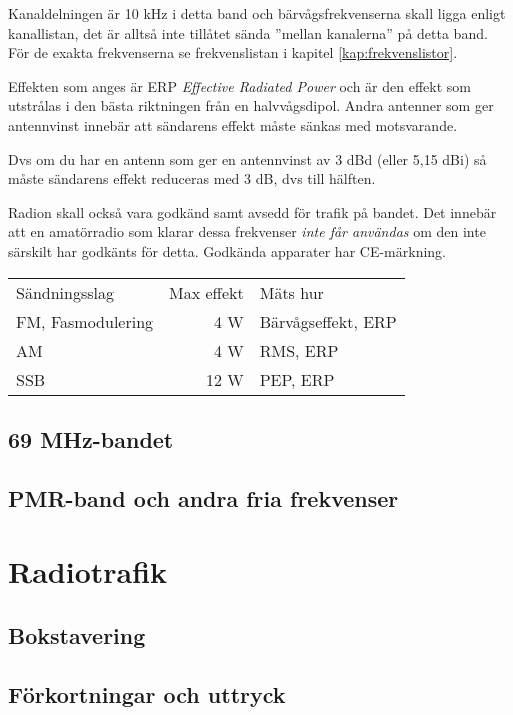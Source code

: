 \documentclass[12ypt,swedish,a4paper]{report}
\begin{document}
Kanaldelningen är 10 kHz i detta band och bärvågsfrekvenserna skall ligga enligt kanallistan, det är alltså inte tillåtet sända ''mellan kanalerna'' på detta band. För de exakta frekvenserna se frekvenslistan i kapitel \ref{kap:frekvenslistor}. 

Effekten som anges är ERP \textit{Effective Radiated Power} och är den effekt som utstrålas i den bästa riktningen från en halvvågsdipol. Andra antenner som ger antennvinst innebär att sändarens effekt måste sänkas med motsvarande.

Dvs om du har en antenn som ger en antennvinst av 3 dBd (eller 5,15 dBi) så måste sändarens effekt reduceras med 3 dB, dvs till hälften.

Radion skall också vara godkänd samt avsedd för trafik på bandet. Det innebär att en amatörradio som klarar dessa frekvenser \textit{inte får användas} om den inte särskilt har godkänts för detta. Godkända apparater har CE-märkning.

\begin{table}[h]
\begin{tabular}{lrl}
	Sändningsslag     & Max effekt & Mäts hur           \\
	FM, Fasmodulering & 4 W        & Bärvågseffekt, ERP \\
	AM                & 4 W        & RMS, ERP           \\
	SSB               & 12 W       & PEP, ERP
\end{tabular}
\end{table}

\section{69 MHz-bandet}

\section{PMR-band och andra fria frekvenser}

\chapter{Radiotrafik}
\label{kap:radiotrafik}

\section{Bokstavering}

\section{Förkortningar och uttryck}
\end{document}
